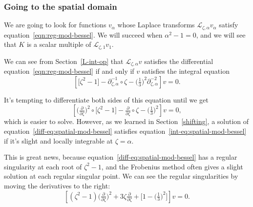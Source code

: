 \documentclass{article}
\newcommand{\fracderiv}[3]{\partial^{#1}_{#2, #3}}
\newcommand{\laplace}{\mathcal{L}}
\begin{document}
\subsubsection{Going to the spatial domain}\label{spatial}
We are going to look for functions $v_\alpha$ whose Laplace transforms $\laplace_{\zeta, \alpha} v_\alpha$ satisfy equation~\eqref{eqn:reg-mod-bessel}. We will succeed when $\alpha^2 - 1 = 0$, and we will see that $K$ is a scalar multiple of $\laplace_{\zeta, 1} v_1$.

We can see from Section~\ref{L-int-op} that $\laplace_{\zeta, \alpha} v$ satisfies the differential equation~\eqref{eqn:reg-mod-bessel} if and only if $v$ satisfies the integral equation
\begin{equation}\label{int-eq:spatial-mod-bessel}
\left[ \big[ \zeta^2 - 1 \big] - \fracderiv{-1}{\zeta}{\alpha} \circ \zeta - \big(\tfrac{1}{3}\big)^2 \fracderiv{-2}{\zeta}{\alpha} \right] v = 0.
\end{equation}

It's tempting to differentiate both sides of this equation until we get
\begin{equation}\label{diff-eq:spatial-mod-bessel}
\left[ \big(\tfrac{\partial}{\partial \zeta}\big)^2 \circ \big[ \zeta^2 - 1 \big] - \tfrac{\partial}{\partial \zeta} \circ \zeta - \big(\tfrac{1}{3}\big)^2 \right] v = 0,
\end{equation}
which is easier to solve. However, as we learned in Section~\ref{shifting}, a solution of equation~\eqref{diff-eq:spatial-mod-bessel} satisfies equation~\eqref{int-eq:spatial-mod-bessel} if it's slight and locally integrable at $\zeta = \alpha$. 

This is great news, because equation~\eqref{diff-eq:spatial-mod-bessel} has a regular singularity at each root of $\zeta^2 - 1$, and the Frobenius method often gives a slight solution at each regular singular point. We can see the regular singularities by moving the derivatives to the right:
\[ \left[ (\zeta^2 - 1) \big(\tfrac{\partial}{\partial \zeta}\big)^2 + 3\zeta \tfrac{\partial}{\partial \zeta} + \big[ 1 - \big(\tfrac{1}{3}\big)^2 \big] \right] v = 0. \]
\end{document}

